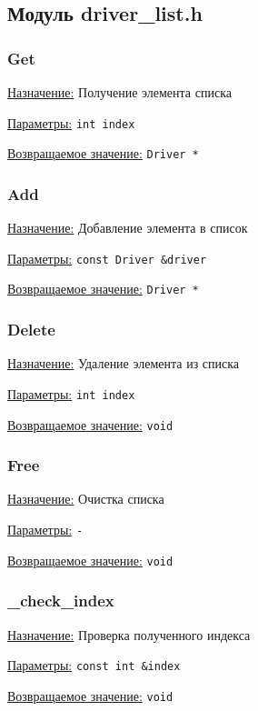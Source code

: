\subsection{Модуль driver\_list.h}


\subsubsection{Get}

\underline{Назначение:} Получение элемента списка

\underline{Параметры:} \verb|int index|

\underline{Возвращаемое значение:} \verb|Driver *|


\subsubsection{Add}

\underline{Назначение:} Добавление элемента в список

\underline{Параметры:} \verb|const Driver &driver|

\underline{Возвращаемое значение:} \verb|Driver *|


\subsubsection{Delete}

\underline{Назначение:} Удаление элемента из списка

\underline{Параметры:} \verb|int index|

\underline{Возвращаемое значение:} \verb|void|


\subsubsection{Free}

\underline{Назначение:} Очистка списка

\underline{Параметры:} \verb|-|

\underline{Возвращаемое значение:} \verb|void|


\subsubsection{\_check\_index}

\underline{Назначение:} Проверка полученного индекса

\underline{Параметры:} \verb|const int &index|

\underline{Возвращаемое значение:} \verb|void|

